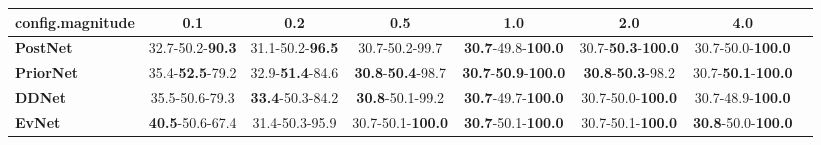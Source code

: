 \begin{tabular}{lccccccc}
\toprule
\textbf{config.magnitude} &                      0.1 &                      0.2 &                               0.5 &                                         1.0 &                                2.0 &                                4.0 \\
\midrule
\textbf{PostNet } &  32.7-50.2-\textbf{90.3} &  31.1-50.2-\textbf{96.5} &                    30.7-50.2-99.7 &           \textbf{30.7}-49.8-\textbf{100.0} &  30.7-\textbf{50.3}-\textbf{100.0} &           30.7-50.0-\textbf{100.0} \\
\textbf{PriorNet} &  35.4-\textbf{52.5}-79.2 &  32.9-\textbf{51.4}-84.6 &  \textbf{30.8}-\textbf{50.4}-98.7 &  \textbf{30.7}-\textbf{50.9}-\textbf{100.0} &   \textbf{30.8}-\textbf{50.3}-98.2 &  30.7-\textbf{50.1}-\textbf{100.0} \\
\textbf{DDNet   } &           35.5-50.6-79.3 &  \textbf{33.4}-50.3-84.2 &           \textbf{30.8}-50.1-99.2 &           \textbf{30.7}-49.7-\textbf{100.0} &           30.7-50.0-\textbf{100.0} &           30.7-48.9-\textbf{100.0} \\
\textbf{EvNet   } &  \textbf{40.5}-50.6-67.4 &           31.4-50.3-95.9 &          30.7-50.1-\textbf{100.0} &           \textbf{30.7}-50.1-\textbf{100.0} &           30.7-50.1-\textbf{100.0} &  \textbf{30.8}-50.0-\textbf{100.0} \\
\bottomrule
\end{tabular}

